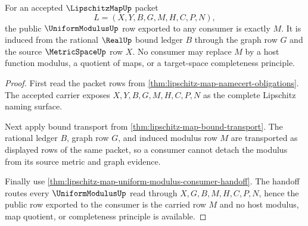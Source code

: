 \begin{theorem}
\label{thm:lipschitz-map-public-modulus-export}
For an accepted $\LipschitzMapUp$ packet
$$
L=(X,Y,B,G,M,H,C,P,N),
$$
the public $\UniformModulusUp$ row exported to any consumer is exactly $M$. It is induced from the rational $\RealUp$ bound ledger $B$ through the graph row $G$ and the source $\MetricSpaceUp$ row $X$. No consumer may replace $M$ by a host function modulus, a quotient of maps, or a target-space completeness principle.
\end{theorem}
\begin{proof}
First read the packet rows from \autoref{thm:lipschitz-map-namecert-obligations}. The accepted carrier exposes $X,Y,B,G,M,H,C,P,N$ as the complete Lipschitz naming surface.

Next apply bound transport from \autoref{thm:lipschitz-map-bound-transport}. The rational ledger $B$, graph row $G$, and induced modulus row $M$ are transported as displayed rows of the same packet, so a consumer cannot detach the modulus from its source metric and graph evidence.

Finally use \autoref{thm:lipschitz-map-uniform-modulus-consumer-handoff}. The handoff routes every $\UniformModulusUp$ read through $X,G,B,M,H,C,P,N$, hence the public row exported to the consumer is the carried row $M$ and no host modulus, map quotient, or completeness principle is available.
\end{proof}

